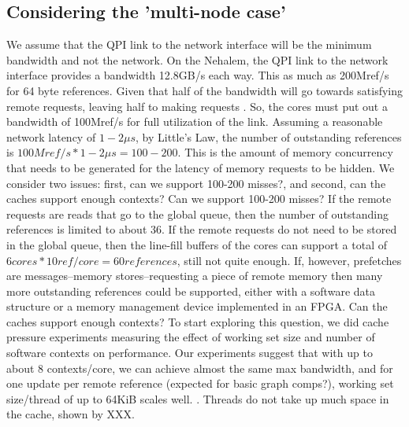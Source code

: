 \subsection{Considering the 'multi-node case'}
	We assume that the QPI link to the network interface will be the minimum bandwidth and not the network. On the Nehalem, the QPI link to the network interface provides a bandwidth 12.8GB/s each way. This as much as 200Mref/s for 64 byte references. Given that half of the bandwidth will go towards satisfying remote requests, leaving half to making requests .  So, the cores must put out a bandwidth of 100Mref/s for full utilization of the link.  Assuming a reasonable network latency of $1-2\mu s$, by Little's Law, the number of outstanding references is $100Mref/s*1-2\mu s = 100-200$. This is the amount of memory concurrency that needs to be generated for the latency of memory requests to be hidden.
We consider two issues: first, can we support 100-200 misses?, and second, can the caches support enough contexts? 
	Can we support 100-200 misses? If the remote requests are reads that go to the global queue, then the number of outstanding references is limited to about 36. If the remote requests do not need to be stored in the global queue, then the line-fill buffers of the cores can support a total of $6 cores * 10 ref/core = 60 references$, still not quite enough. If, however, prefetches are messages--memory stores--requesting a piece of remote memory then many more outstanding references could be supported, either with a software data structure or a memory management device implemented in an FPGA.
	Can the caches support enough contexts? To start exploring this question, we did cache pressure experiments measuring the effect of working set size and number of software contexts on performance. Our experiments suggest that with up to about 8 contexts/core, we can achieve almost the same max bandwidth, and for one update per remote reference (expected for basic graph comps?), working set size/thread of up to 64KiB scales well. .  Threads do not take up much space in the cache, shown by XXX.


